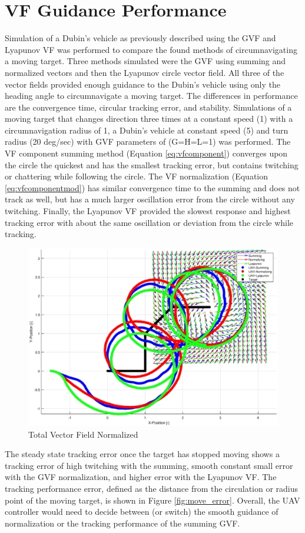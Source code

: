 \documentclass[conf]{new-aiaa}
\begin{document}
\section{VF Guidance Performance}
Simulation of a Dubin's vehicle as previously described using the GVF and Lyapunov VF was performed to compare the found methods of circumnavigating a moving target. Three methods simulated were the GVF using summing and normalized vectors and then the Lyapunov circle vector field. All three of the vector fields provided enough guidance to the Dubin's vehicle using only the heading angle to circumnavigate a moving target. The differences in performance are the convergence time, circular tracking error, and stability. Simulations of a moving target that changes direction three times at a constant speed (1) with a circumnavigation radius of 1, a Dubin's vehicle at constant speed (5) and turn radius (20 deg/sec) with GVF parameters of (G=H=L=1) was performed. The VF component summing method (Equation \ref{eq:vfcomponent}) converges upon the circle the quickest and has the smallest tracking error, but contains twitching or chattering while following the circle. The VF normalization (Equation \ref{eq:vfcomponentmod}) has similar convergence time to the summing and does not track as well, but has a much larger oscillation error from the circle without any twitching. Finally, the Lyapunov VF provided the slowest response and highest tracking error with about the same oscillation or deviation from the circle while tracking. 
\begin{figure}[H]
	\centering
	\includegraphics[width=6.5in]{moving3uavresult.eps}
	\caption{Total Vector Field Normalized}
	\label{fig:alln2}
\end{figure}
The steady state tracking error once the target has stopped moving shows a tracking error of high twitching with the summing, smooth constant small error with the GVF normalization, and higher error with the Lyapunov VF. The tracking performance error, defined as the distance from the circulation or radius point of the moving target, is shown in Figure \ref{fig:move_error}. Overall, the UAV controller would need to decide between (or switch) the smooth guidance of normalization or the tracking performance of the summing GVF. 
\end{document}
